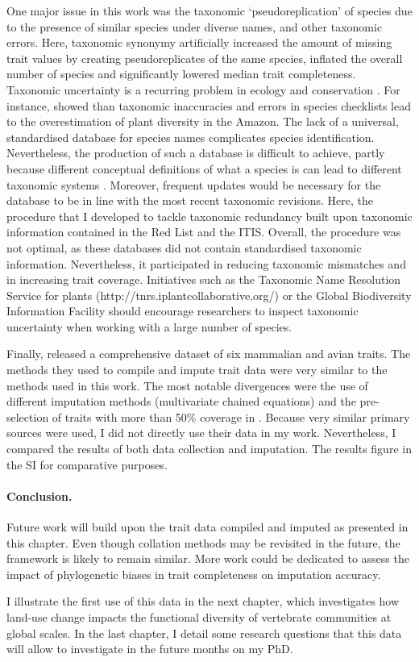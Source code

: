 One major issue in this work was the taxonomic `pseudoreplication' of species due to the presence of similar species under diverse names, and other taxonomic errors. Here, taxonomic synonymy artificially increased the amount of missing trait values by creating pseudoreplicates of the same species, inflated the overall number of species and significantly lowered median trait completeness. Taxonomic uncertainty is a recurring problem in ecology and conservation \citep{Isaac2004}. For instance, \citet{Cardoso2017} showed than taxonomic inaccuracies and errors in species checklists lead to the overestimation of plant diversity in the Amazon. The lack of a universal, standardised database for species names complicates species identification. Nevertheless, the production of such a database is difficult to achieve, partly because different conceptual definitions of what a species is can lead to different taxonomic systems \citep{Isaac2004}. Moreover, frequent updates would be necessary for the database to be in line with the most recent taxonomic revisions. Here, the procedure that I developed to tackle taxonomic redundancy built upon taxonomic information contained in the Red List and the ITIS. Overall, the procedure was not optimal, as these databases did not contain standardised taxonomic information. Nevertheless, it participated in reducing taxonomic mismatches and in increasing trait coverage. Initiatives such as the Taxonomic Name Resolution Service for plants (http://tnrs.iplantcollaborative.org/) or the Global Biodiversity Information Facility should encourage researchers to inspect taxonomic uncertainty when working with a large number of species.

Finally, \citet{Cooke2019} released a comprehensive dataset of six mammalian and avian traits. The methods they used to compile and impute trait data were very similar to the methods used in this work. The most notable divergences were the use of different imputation methods (multivariate chained equations) and the pre-selection of traits with more than 50\% coverage in \citet{Cooke2019}. Because very similar primary sources were used, I did not directly use their data in my work. Nevertheless, I compared the results of both data collection and imputation. The results figure in the SI for comparative purposes.
 
\paragraph{Conclusion.}
Future work will build upon the trait data compiled and imputed as presented in this chapter. Even though collation methods may be revisited in the future, the framework is likely to remain similar. More work could be dedicated to assess the impact of phylogenetic biases in trait completeness on imputation accuracy.

I illustrate the first use of this data in the next chapter, which investigates how land-use change impacts the functional diversity of vertebrate communities at global scales. In the last chapter, I detail some research questions that this data will allow to investigate in the future months on my PhD.
